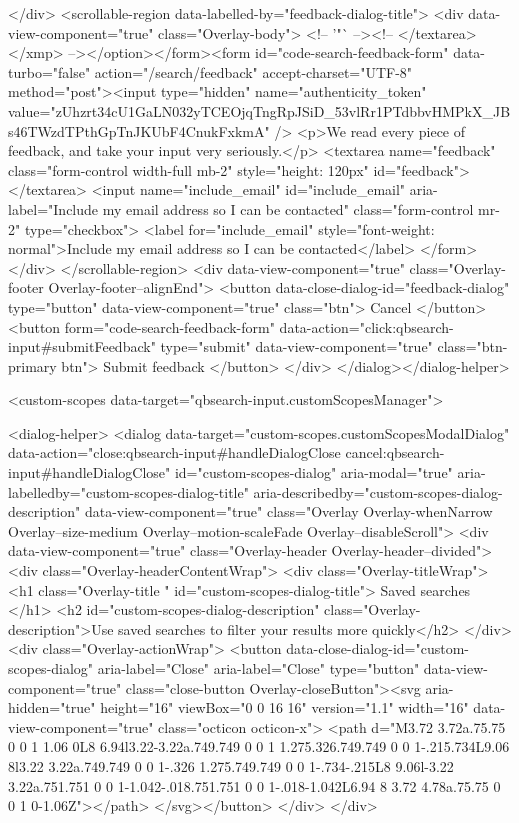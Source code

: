 {{</div>
      <scrollable-region data-labelled-by="feedback-dialog-title">
        <div data-view-component="true" class="Overlay-body">        <!-- '"` --><!-- </textarea></xmp> --></option></form><form id="code-search-feedback-form" data-turbo="false" action="/search/feedback" accept-charset="UTF-8" method="post"><input type="hidden" name="authenticity_token" value="zUhzrt34cU1GaLN032yTCEOjqTngRpJSiD_53vlRr1PTdbbvHMPkX_JBs46TWzdTPthGpTnJKUbF4CnukFxkmA" />
          <p>We read every piece of feedback, and take your input very seriously.</p>
          <textarea name="feedback" class="form-control width-full mb-2" style="height: 120px" id="feedback"></textarea>
          <input name="include_email" id="include_email" aria-label="Include my email address so I can be contacted" class="form-control mr-2" type="checkbox">
          <label for="include_email" style="font-weight: normal">Include my email address so I can be contacted</label>
</form></div>
      </scrollable-region>
      <div data-view-component="true" class="Overlay-footer Overlay-footer--alignEnd">          <button data-close-dialog-id="feedback-dialog" type="button" data-view-component="true" class="btn">    Cancel
</button>
          <button form="code-search-feedback-form" data-action="click:qbsearch-input#submitFeedback" type="submit" data-view-component="true" class="btn-primary btn">    Submit feedback
</button>
</div>
</dialog></dialog-helper>

    <custom-scopes data-target="qbsearch-input.customScopesManager">
    
<dialog-helper>
  <dialog data-target="custom-scopes.customScopesModalDialog" data-action="close:qbsearch-input#handleDialogClose cancel:qbsearch-input#handleDialogClose" id="custom-scopes-dialog" aria-modal="true" aria-labelledby="custom-scopes-dialog-title" aria-describedby="custom-scopes-dialog-description" data-view-component="true" class="Overlay Overlay-whenNarrow Overlay--size-medium Overlay--motion-scaleFade Overlay--disableScroll">
    <div data-view-component="true" class="Overlay-header Overlay-header--divided">
  <div class="Overlay-headerContentWrap">
    <div class="Overlay-titleWrap">
      <h1 class="Overlay-title " id="custom-scopes-dialog-title">
        Saved searches
      </h1>
        <h2 id="custom-scopes-dialog-description" class="Overlay-description">Use saved searches to filter your results more quickly</h2>
    </div>
    <div class="Overlay-actionWrap">
      <button data-close-dialog-id="custom-scopes-dialog" aria-label="Close" aria-label="Close" type="button" data-view-component="true" class="close-button Overlay-closeButton"><svg aria-hidden="true" height="16" viewBox="0 0 16 16" version="1.1" width="16" data-view-component="true" class="octicon octicon-x">
    <path d="M3.72 3.72a.75.75 0 0 1 1.06 0L8 6.94l3.22-3.22a.749.749 0 0 1 1.275.326.749.749 0 0 1-.215.734L9.06 8l3.22 3.22a.749.749 0 0 1-.326 1.275.749.749 0 0 1-.734-.215L8 9.06l-3.22 3.22a.751.751 0 0 1-1.042-.018.751.751 0 0 1-.018-1.042L6.94 8 3.72 4.78a.75.75 0 0 1 0-1.06Z"></path>
</svg></button>
    </div>
  </div>
  
}}
